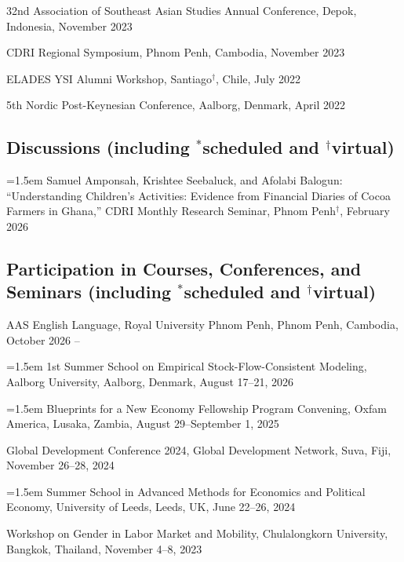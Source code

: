 \documentclass[10pt,a4paper]{article}
\begin{document}
32nd Association of Southeast Asian Studies Annual Conference, Depok, Indonesia, November 2023

CDRI Regional Symposium, Phnom Penh, Cambodia, November 2023

ELADES YSI Alumni Workshop, Santiago$^\dag$, Chile, July 2022

5th Nordic Post-Keynesian Conference, Aalborg, Denmark, April 2022


\subsection*{Discussions (including $^\ast$scheduled and $^\dag$virtual)}

\hangindent=1.5em
Samuel Amponsah, Krishtee Seebaluck, and Afolabi Balogun: “Understanding Children’s Activities: Evidence from Financial Diaries of Cocoa Farmers in Ghana,” CDRI Monthly Research Seminar, Phnom Penh$^\dag$, February 2026
\subsection*{Participation in Courses, Conferences, and Seminars (including $^\ast$scheduled and $^\dag$virtual)}

AAS English Language, Royal University Phnom Penh, Phnom Penh, Cambodia, October 2026 --

\hangindent=1.5em
1st Summer School on Empirical Stock-Flow-Consistent Modeling, Aalborg University, Aalborg, Denmark, August 17--21, 2026

\hangindent=1.5em
Blueprints for a New Economy Fellowship Program Convening, Oxfam America, Lusaka, Zambia, August 29--September 1, 2025

Global Development Conference 2024, Global Development Network, Suva, Fiji, November 26--28, 2024 

\hangindent=1.5em
Summer School in Advanced Methods for Economics and Political Economy, University of Leeds, Leeds, UK, June 22--26, 2024

Workshop on Gender in Labor Market and Mobility, Chulalongkorn University, Bangkok, Thailand, November 4--8, 2023
\end{document}
